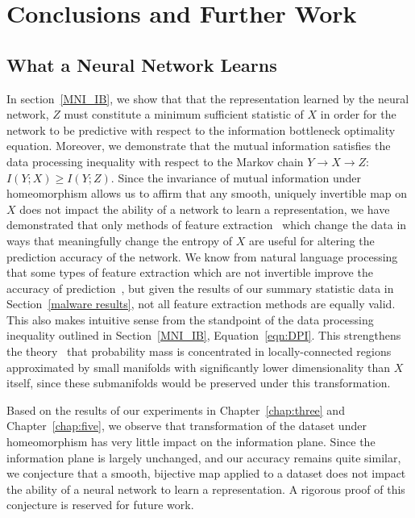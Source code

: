\chapter{Conclusions and Further Work}
\label{chap:conclusion}

\section{What a Neural Network Learns}
In section~\ref{MNI_IB}, we show that that the representation learned by the neural network, $Z$ must constitute a minimum sufficient statistic of $X$ in order for the network to be predictive with respect to the information bottleneck optimality equation. 
Moreover, we demonstrate that the mutual information satisfies the data processing inequality with respect to the Markov chain $Y \to X \to Z$: $I(Y; X) \geq I(Y; Z)$.
Since the invariance of mutual information under homeomorphism allows us to affirm that any smooth, uniquely invertible map on $X$ does not impact the ability of a network to learn a representation, we have demonstrated that only methods of feature extraction~\cite{goodfellow2016deep} which change the data in ways that meaningfully change the entropy of $X$ are useful for altering the prediction accuracy of the network.
We know from natural language processing that some types of feature extraction which are not invertible improve the accuracy of prediction~\cite{goodfellow2016deep}, but given the results of our summary statistic data in Section~\ref{malware results}, not all feature extraction methods are equally valid.
This also makes intuitive sense from the standpoint of the data processing inequality outlined in Section~\ref{MNI_IB}, Equation~\ref{eqn:DPI}.
This strengthens the theory~\cite{krizhevsky2012imagenet} that probability mass is concentrated in locally-connected regions approximated by small manifolds with significantly lower dimensionality than $X$ itself, since these submanifolds would be preserved under this transformation.

Based on the results of our experiments in Chapter~\ref{chap:three} and Chapter~\ref{chap:five}, we observe that transformation of the dataset under homeomorphism has very little impact on the information plane.
Since the information plane is largely unchanged, and our accuracy remains quite similar, we conjecture that a smooth, bijective map applied to a dataset does not impact the ability of a neural network to learn a representation.
A rigorous proof of this conjecture is reserved for future work.

